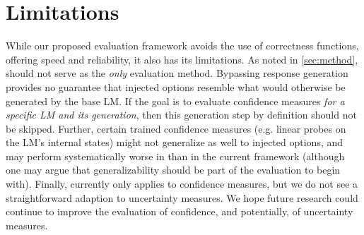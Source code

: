 \section*{Limitations}
While our proposed evaluation framework avoids the use of correctness functions, offering speed and reliability, it also has its limitations.
As noted in \cref{sec:method}, \uqeval should not serve as the \emph{only} evaluation method.
Bypassing response generation provides no guarantee that injected options resemble what would otherwise be generated by the base LM.
If the goal is to evaluate confidence measures \textit{for a specific LM and its generation}, then this generation step by definition should not be skipped.
Further, certain trained confidence measures (e.g. linear probes on the LM's internal states) might not generalize as well to injected options, and may perform systematically worse in \uqeval than in the current framework (although one may argue that generalizability should be part of the evaluation to begin with).
Finally, \uqeval currently only applies to confidence measures, but we do not see a straightforward adaption to uncertainty measures. 
We hope future research could continue to improve the evaluation of confidence, and potentially, of uncertainty measures.
